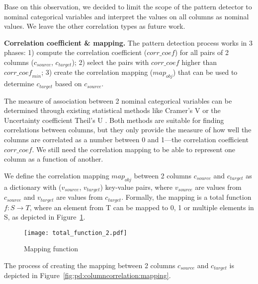 Base on this observation, we decided to limit the scope of the  pattern detector to nominal categorical variables and interpret the values on all columns as nominal values. We leave the other correlation types as future work.

\textbf{Correlation coefficient \& mapping.} The  pattern detection process works in 3 phases: 1) compute the correlation coefficient (\(\mathit{corr\_coef}\)) for all pairs of 2 columns (\(c_{source}\), \(c_{target}\)); 2) select the pairs with \(\mathit{corr\_coef}\) higher than \(\mathit{corr\_coef}_{min}\); 3) create the correlation mapping (\(map_{obj}\)) that can be used to determine \(c_{target}\) based on \(c_{source}\).

The measure of association between 2 nominal categorical variables can be determined through existing statistical methods like Cramer's V \cite{cramir1946mathematical} or the Uncertainty coefficient Theil's U \cite{press1992theilsu}. Both methods are suitable for finding correlations between columns, but they only provide the measure of how well the columns are correlated as a number between 0 and 1---the correlation coefficient \(\mathit{corr\_coef}\). We still need the correlation mapping to be able to represent one column as a function of another.

We define the correlation mapping \(map_{obj}\) between 2 columns \(c_{source}\) and \(c_{target}\) as a dictionary with (\(v_{source}\), \(v_{target}\)) key-value pairs, where \(v_{source}\) are values from \(c_{source}\) and \(v_{target}\) are values from \(c_{target}\). Formally, the mapping is a total function \(f \colon S \to T\), where an element from T can be mapped to 0, 1 or multiple elements in S, as depicted in Figure~\ref{fig:pd:columncorrelation:totalfunction}.

\begin{figure}[h]
  \centering
  \texttt{[image: total\_function\_2.pdf]}
  \caption{Mapping function}
  \label{fig:pd:columncorrelation:totalfunction}
\end{figure}

The process of creating the mapping between 2 columns \(c_{source}\) and \(c_{target}\) is depicted in Figure~\ref{fig:pd:columncorrelation:mapping}.

